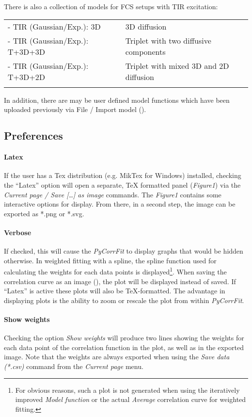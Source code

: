 There is also a collection of models for FCS setups with TIR excitation:

\begin{tabular}{l l}
\rule{0pt}{3ex} - TIR (Gaussian/Exp.): 3D & 3D diffusion \\
\rule{0pt}{3ex} - TIR (Gaussian/Exp.): T+3D+3D & Triplet with two diffusive components \\
\rule{0pt}{3ex} - TIR (Gaussian/Exp.): T+3D+2D & Triplet with mixed 3D and 2D diffusion \\
\rule{0pt}{3ex}
\end{tabular}


In addition, there are may be user defined model functions which have been uploaded previously via File / Import model ().

\subsection{Preferences}
\paragraph*{Latex} If the user has a Tex distribution (e.g. MikTex for Windows) installed, checking the ``Latex'' option will open a separate, TeX formatted panel (\textit{Figure1}) via the \textit{Current page / Save […] as image} commands. The \textit{Figure1} contains some interactive options for display. From there, in a second step, the image can be exported as *.png or *.svg.

\paragraph*{Verbose} If checked, this will cause the \textit{PyCorrFit} to display graphs that would be hidden otherwise. In weighted fitting with a spline, the spline function used for calculating the weights for each data points is displayed\footnote{For obvious reasons, such a plot is not generated when using the iteratively improved \textit{Model function} or the actual \textit{Average} correlation curve for weighted fitting.}. When saving the correlation curve as an image (), the plot will be displayed instead of saved. If ``Latex'' is active these plots will also be TeX-formatted. The advantage in displaying plots is the ability to zoom or rescale the plot from within \textit{PyCorrFit}.

\paragraph*{Show weights}
Checking the option \textit{Show weights} will produce two lines showing the weights for each data point of the correlation function in the plot, as well as in the exported image. Note that the weights are always exported when using the \textit{Save data (*.csv)} command from the \textit{Current page} menu.

